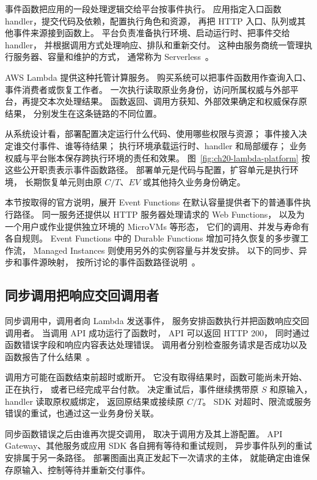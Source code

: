 事件函数把应用的一段处理逻辑交给平台按事件执行。
应用指定入口函数 handler，提交代码及依赖，配置执行角色和资源，
再把 HTTP 入口、队列或其他事件来源接到函数上。
平台负责准备执行环境、启动运行时、把事件交给 handler，
并根据调用方式处理响应、排队和重新交付。
这种由服务商统一管理执行服务器、容量和维护的方式，
通常称为 Serverless~\cite{lambda-event-overview}。

AWS Lambda 提供这种托管计算服务。
购买系统可以把事件函数用作查询入口、事件消费者或恢复工作者。
一次执行读取原业务身份，访问所属权威与外部平台，再提交本次处理结果。
函数返回、调用方获知、外部效果确定和权威保存原结果，
分别发生在这条链路的不同位置。

从系统设计看，部署配置决定运行什么代码、使用哪些权限与资源；
事件接入决定谁交付事件、谁等待结果；
执行环境承载运行时、handler 和局部缓存；
业务权威与平台账本保存跨执行环境的责任和效果。
图~\ref{fig:ch20-lambda-platform} 按这些公开职责表示事件函数路径。
部署单元是代码与配置，扩容单元是执行环境，
长期恢复单元则由原 $C/T$、$EV$ 或其他持久业务身份确定。


本节按取得的官方说明，展开 Event Functions
在默认容量提供者下的普通事件执行路径。
同一服务还提供以 HTTP 服务器处理请求的 Web Functions，
以及为一个用户或作业提供独立环境的 MicroVMs 等形态，
它们的调用、并发与寿命有各自规则。
Event Functions 中的 Durable Functions
增加可持久恢复的多步骤工作流，
Managed Instances 则使用另外的实例容量与并发安排。
以下的同步、异步和事件源映射，
按所讨论的事件函数路径说明~\cite{lambda-event-overview,lambda-lifecycle}。

\subsection{同步调用把响应交回调用者}

同步调用中，调用者向 Lambda 发送事件，
服务安排函数执行并把函数响应交回调用者。
当调用 API 成功运行了函数时，
API 可以返回 HTTP 200，
同时通过函数错误字段和响应内容表达处理错误。
调用者分别检查服务请求是否成功以及函数报告了什么结果~\cite{lambda-invocation}。

调用方可能在函数结束前超时或断开。
它没有取得结果时，函数可能尚未开始、正在执行，
或者已经完成平台付款。
决定重试后，事件继续携带原 $S$ 和原输入，
handler 读取原权威绑定，
返回原结果或接续原 $C/T$。
SDK 对超时、限流或服务错误的重试，也通过这一业务身份关联。

同步函数错误之后由谁再次提交调用，
取决于调用方及其上游配置。
API Gateway、其他服务或应用 SDK 各自拥有等待和重试规则，
异步事件队列的重试安排属于另一条路径。
部署图画出真正发起下一次请求的主体，
就能确定由谁保存原输入、控制等待并重新交付事件。

